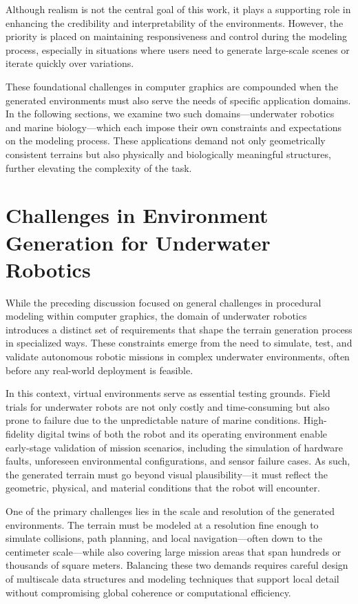 Although realism is not the central goal of this work, it plays a supporting role in enhancing the credibility and interpretability of the environments. However, the priority is placed on maintaining responsiveness and control during the modeling process, especially in situations where users need to generate large-scale scenes or iterate quickly over variations.

These foundational challenges in computer graphics are compounded when the generated environments must also serve the needs of specific application domains. In the following sections, we examine two such domains—underwater robotics and marine biology—which each impose their own constraints and expectations on the modeling process. These applications demand not only geometrically consistent terrains but also physically and biologically meaningful structures, further elevating the complexity of the task.

\section{Challenges in Environment Generation for Underwater Robotics}

While the preceding discussion focused on general challenges in procedural modeling within computer graphics, the domain of underwater robotics introduces a distinct set of requirements that shape the terrain generation process in specialized ways. These constraints emerge from the need to simulate, test, and validate autonomous robotic missions in complex underwater environments, often before any real-world deployment is feasible.

In this context, virtual environments serve as essential testing grounds. Field trials for underwater robots are not only costly and time-consuming but also prone to failure due to the unpredictable nature of marine conditions. High-fidelity digital twins of both the robot and its operating environment enable early-stage validation of mission scenarios, including the simulation of hardware faults, unforeseen environmental configurations, and sensor failure cases. As such, the generated terrain must go beyond visual plausibility—it must reflect the geometric, physical, and material conditions that the robot will encounter.

One of the primary challenges lies in the scale and resolution of the generated environments. The terrain must be modeled at a resolution fine enough to simulate collisions, path planning, and local navigation—often down to the centimeter scale—while also covering large mission areas that span hundreds or thousands of square meters. Balancing these two demands requires careful design of multiscale data structures and modeling techniques that support local detail without compromising global coherence or computational efficiency.

